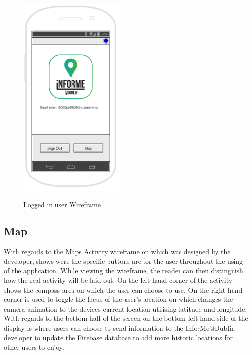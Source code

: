 \begin{figure}[htbp]
    \center \includegraphics[width=150pt]{LoggedInWireframe}\\
    \caption{Logged in user Wireframe} \label{Figure: Logged in user Wireframe}
\end{figure}

\newpage

\subsection{Map}
With regards to the Maps Activity wireframe on which was designed by the developer, shows were the specific buttons are for the user throughout the using of the application. While viewing the wireframe, the reader can then distinguish how the real activity will be laid out. On the left-hand corner of the activity shows the compass area on which the user can choose to use. On the right-hand corner is used to toggle the focus of the user's location on which changes the camera animation to the devices current location utilising latitude and longitude. With regards to the bottom half of the screen on the bottom left-hand side of the display is where users can choose to send information to the InforMe@Dublin developer to update the Firebase database to add more historic locations for other users to enjoy.

